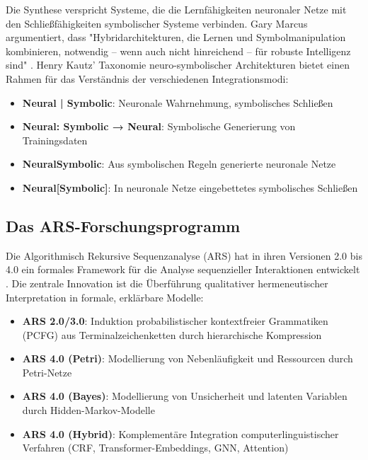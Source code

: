 \documentclass[12pt,a4paper]{article}
\begin{document}
Die Synthese verspricht Systeme, die die Lernfähigkeiten neuronaler Netze mit 
den Schließfähigkeiten symbolischer Systeme verbinden. Gary Marcus argumentiert, 
dass "Hybridarchitekturen, die Lernen und Symbolmanipulation kombinieren, notwendig 
– wenn auch nicht hinreichend – für robuste Intelligenz sind" \citep{marcus2020next}. 
Henry Kautz' Taxonomie neuro-symbolischer Architekturen \citep{kautz2020third} 
bietet einen Rahmen für das Verständnis der verschiedenen Integrationsmodi:

\begin{itemize}
    \item \textbf{Neural | Symbolic}: Neuronale Wahrnehmung, symbolisches Schließen
    \item \textbf{Neural: Symbolic → Neural}: Symbolische Generierung von Trainingsdaten
    \item \textbf{NeuralSymbolic}: Aus symbolischen Regeln generierte neuronale Netze
    \item \textbf{Neural[Symbolic]}: In neuronale Netze eingebettetes symbolisches Schließen
\end{itemize}

\subsection{Das ARS-Forschungsprogramm}

Die Algorithmisch Rekursive Sequenzanalyse (ARS) hat in ihren Versionen 2.0 bis 
4.0 ein formales Framework für die Analyse sequenzieller Interaktionen entwickelt 
\citep{koop2024ars}. Die zentrale Innovation ist die Überführung qualitativer 
hermeneutischer Interpretation in formale, erklärbare Modelle:

\begin{itemize}
    \item \textbf{ARS 2.0/3.0}: Induktion probabilistischer kontextfreier 
    Grammatiken (PCFG) aus Terminalzeichenketten durch hierarchische Kompression
    \item \textbf{ARS 4.0 (Petri)}: Modellierung von Nebenläufigkeit und 
    Ressourcen durch Petri-Netze
    \item \textbf{ARS 4.0 (Bayes)}: Modellierung von Unsicherheit und latenten 
    Variablen durch Hidden-Markov-Modelle
    \item \textbf{ARS 4.0 (Hybrid)}: Komplementäre Integration computerlinguistischer 
    Verfahren (CRF, Transformer-Embeddings, GNN, Attention)
\end{itemize}
\end{document}
